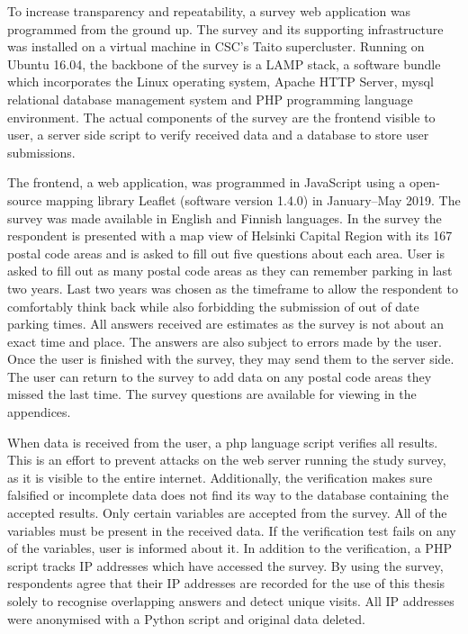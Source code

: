 To increase transparency and repeatability, a survey web application was programmed from the ground up. The survey and its supporting infrastructure was installed on a virtual machine in CSC's Taito supercluster. Running on Ubuntu 16.04, the backbone of the survey is a LAMP stack, a software bundle which incorporates the Linux operating system, Apache HTTP Server, \gls{mysql} relational database management system and PHP programming language environment. The actual components of the survey are the frontend visible to user, a server side script to verify received data and a database to store user submissions. 

The frontend, a web application, was programmed in JavaScript using a open-source mapping library Leaflet (software version 1.4.0) in January--May 2019. The survey was made available in English and Finnish languages. In the survey the respondent is presented with a map view of Helsinki Capital Region with its 167 postal code areas and is asked to fill out five questions about each area. User is asked to fill out as many postal code areas as they can remember parking in last two years. Last two years was chosen as the timeframe to allow the respondent to comfortably think back while also forbidding the submission of out of date parking times. All answers received are estimates as the survey is not about an exact time and place. The answers are also subject to errors made by the user. Once the user is finished with the survey, they may send them to the server side. The user can return to the survey to add data on any postal code areas they missed the last time. The survey questions are available for viewing in the appendices.

When data is received from the user, a \gls{php} language script verifies all results. This is an effort to prevent attacks on the web server running the study survey, as it is visible to the entire internet. Additionally, the verification makes sure falsified or incomplete data does not find its way to the database containing the accepted results. Only certain variables are accepted from the survey. All of the variables must be present in the received data. If the verification test fails on any of the variables, user is informed about it. In addition to the verification, a PHP script tracks IP addresses which have accessed the survey. By using the survey, respondents agree that their IP addresses are recorded for the use of this thesis solely to recognise overlapping answers and detect unique visits. All IP addresses were anonymised with a Python script and original data deleted.

